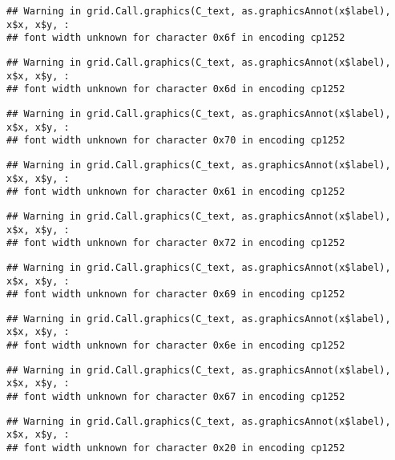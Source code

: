 \documentclass[
]{article}
\begin{document}
\begin{verbatim}
## Warning in grid.Call.graphics(C_text, as.graphicsAnnot(x$label), x$x, x$y, :
## font width unknown for character 0x6f in encoding cp1252
\end{verbatim}

\begin{verbatim}
## Warning in grid.Call.graphics(C_text, as.graphicsAnnot(x$label), x$x, x$y, :
## font width unknown for character 0x6d in encoding cp1252
\end{verbatim}

\begin{verbatim}
## Warning in grid.Call.graphics(C_text, as.graphicsAnnot(x$label), x$x, x$y, :
## font width unknown for character 0x70 in encoding cp1252
\end{verbatim}

\begin{verbatim}
## Warning in grid.Call.graphics(C_text, as.graphicsAnnot(x$label), x$x, x$y, :
## font width unknown for character 0x61 in encoding cp1252
\end{verbatim}

\begin{verbatim}
## Warning in grid.Call.graphics(C_text, as.graphicsAnnot(x$label), x$x, x$y, :
## font width unknown for character 0x72 in encoding cp1252
\end{verbatim}

\begin{verbatim}
## Warning in grid.Call.graphics(C_text, as.graphicsAnnot(x$label), x$x, x$y, :
## font width unknown for character 0x69 in encoding cp1252
\end{verbatim}

\begin{verbatim}
## Warning in grid.Call.graphics(C_text, as.graphicsAnnot(x$label), x$x, x$y, :
## font width unknown for character 0x6e in encoding cp1252
\end{verbatim}

\begin{verbatim}
## Warning in grid.Call.graphics(C_text, as.graphicsAnnot(x$label), x$x, x$y, :
## font width unknown for character 0x67 in encoding cp1252
\end{verbatim}

\begin{verbatim}
## Warning in grid.Call.graphics(C_text, as.graphicsAnnot(x$label), x$x, x$y, :
## font width unknown for character 0x20 in encoding cp1252
\end{verbatim}
\end{document}
